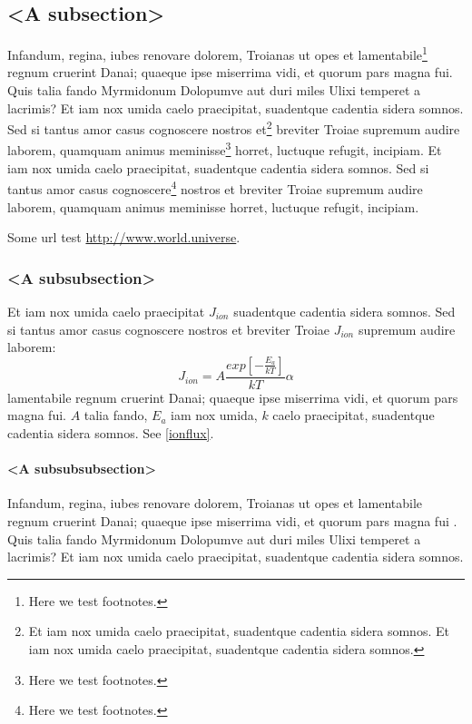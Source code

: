\documentclass[
    ,final            %
  ]
  {aipproc}
\begin{document}
\subsection{<A subsection>}

Infandum, regina, iubes renovare dolorem, Troianas ut opes et
lamentabile\footnote{Here we test footnotes.} regnum cruerint Danai;
quaeque ipse miserrima vidi, et quorum pars magna fui. Quis talia
fando Myrmidonum Dolopumve aut duri miles Ulixi temperet a
lacrimis? Et iam nox umida caelo praecipitat, suadentque cadentia
sidera somnos. Sed si tantus amor casus cognoscere nostros
et\footnote{Et iam nox umida caelo praecipitat, suadentque cadentia
sidera somnos. Et iam nox umida caelo praecipitat, suadentque cadentia
sidera somnos.} breviter Troiae supremum audire laborem, quamquam
animus meminisse\footnote{Here we test footnotes.} horret, luctuque
refugit, incipiam.  Et iam nox umida caelo praecipitat, suadentque
cadentia sidera somnos. Sed si tantus amor casus
cognoscere\footnote{Here we test footnotes.} nostros et breviter Troiae
supremum audire laborem, quamquam animus meminisse horret,
luctuque refugit, incipiam.

Some url test \url{http://www.world.universe}.

\subsubsection{<A subsubsection>}

Et iam nox umida caelo praecipitat $J_{ion}$ suadentque cadentia
sidera somnos. Sed si tantus amor casus cognoscere nostros et breviter
Troiae $J_{ion}$ supremum audire laborem:
\begin{equation}
J_{ion}=A\frac{exp\left[-\frac{E_a}{kT}\right]}{kT}\alpha \label{ionflux}
\end{equation}
lamentabile regnum cruerint Danai; quaeque ipse miserrima vidi, et
quorum pars magna fui. $A$ talia fando, $E_a$ iam nox umida, $k$ caelo
praecipitat, suadentque cadentia sidera somnos. See \eqref{ionflux}.

\paragraph{<A subsubsubsection>}

Infandum, regina, iubes renovare dolorem, Troianas ut opes et
lamentabile regnum cruerint Danai; quaeque ipse miserrima vidi, et
quorum pars magna fui \cite{Brown2000,BrownAustin:2000}. Quis talia fando
Myrmidonum Dolopumve aut duri miles Ulixi temperet
\cite{Mittelbach/Schoepf:1990} a lacrimis? Et iam
nox umida caelo praecipitat, suadentque \cite{Wang} cadentia
sidera somnos.
\end{document}
